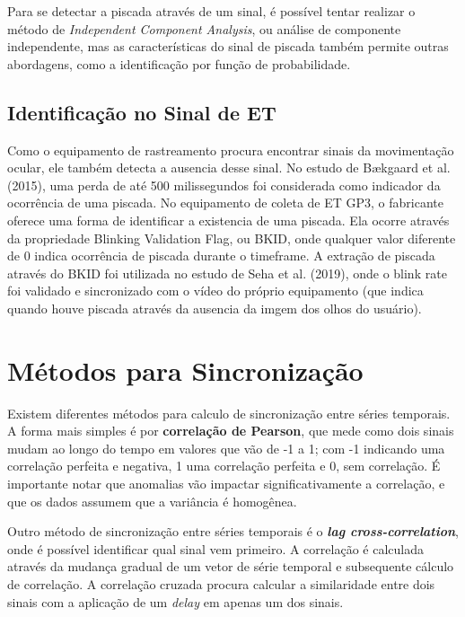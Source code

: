 Para se detectar a piscada através de um sinal, é possível tentar realizar o método de \textit{Independent Component Analysis}, ou análise de 
componente independente, mas as características do sinal de piscada também permite outras abordagens, como a identificação por função de probabilidade.


\subsection{Identificação no Sinal de ET}
Como o equipamento de rastreamento procura encontrar sinais da movimentação ocular, ele também detecta a ausencia desse sinal. No estudo 
de Bækgaard et al. (2015), uma perda de até 500 milissegundos foi considerada como indicador da ocorrência de uma piscada. No equipamento de coleta de ET GP3, 
o fabricante oferece uma forma de identificar a existencia de uma piscada. Ela ocorre através da propriedade Blinking Validation Flag, ou BKID, onde qualquer 
valor diferente de 0 indica ocorrência de piscada durante o timeframe. A extração de piscada através do BKID foi utilizada no estudo de Seha et al. (2019), 
onde o blink rate foi validado e sincronizado com o vídeo do próprio equipamento (que indica quando houve piscada através da ausencia da imgem dos olhos do usuário).



\section{Métodos para Sincronização}
Existem diferentes métodos para calculo de sincronização entre séries temporais. 
A forma mais simples é por \textbf{correlação de Pearson}, que mede como dois sinais mudam ao longo do tempo em valores que vão de -1 a 1;
com -1 indicando uma correlação perfeita e negativa, 1 uma correlação perfeita e 0, sem correlação. 
É importante notar que anomalias vão impactar significativamente a correlação, e que os dados assumem que a variância é homogênea. 

Outro método de sincronização entre séries temporais é o \textit{\textbf{lag cross-correlation}}, onde é possível identificar
qual sinal vem primeiro. A correlação é calculada através da mudança gradual de um vetor de série temporal e subsequente cálculo 
de correlação. A correlação cruzada procura calcular a similaridade entre dois sinais com a aplicação de um \textit{delay} em apenas um dos sinais.

